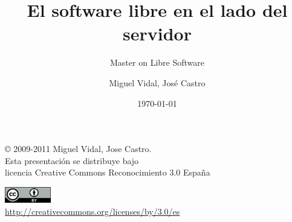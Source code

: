 \documentclass{beamer}
\begin{document}
\title{El software libre en el lado del servidor}
\subtitle{Master on Libre Software}
\author{Miguel Vidal, José Castro}
\date{\today}


\begin{frame}
  \vspace{2cm}
  \begin{flushright}
    {\footnotesize \copyright{} 2009-2011 Miguel Vidal, Jose Castro.} \\
    \medskip
    {\scriptsize Esta presentación se distribuye bajo \\ licencia Creative Commons Reconocimiento 3.0 España}
  \end{flushright}
  \begin{center}
    \href{http://creativecommons.org/licenses/by/3.0/es}{\includegraphics[width=2cm]{format/cc-by.png}} \\
    {\tiny \url{http://creativecommons.org/licenses/by/3.0/es}}
  \end{center}
\end{frame}%

\end{document}
